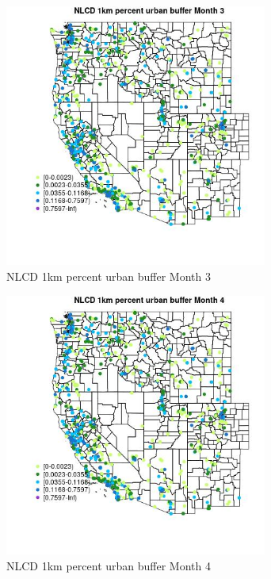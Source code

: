 \begin{figure} 
\centering  
\includegraphics[width=0.77\textwidth]{Code_Outputs/Report_ML_input_PM25_Step4_part_f_de_duplicated_aveswNAs_MapObsMo3NLCD_1km_percent_urban_buffer.jpg} 
\caption{\label{fig:Report_ML_input_PM25_Step4_part_f_de_duplicated_aveswNAsMapObsMo3NLCD_1km_percent_urban_buffer}NLCD 1km percent urban buffer Month 3} 
\end{figure} 
 

\clearpage 

\begin{figure} 
\centering  
\includegraphics[width=0.77\textwidth]{Code_Outputs/Report_ML_input_PM25_Step4_part_f_de_duplicated_aveswNAs_MapObsMo4NLCD_1km_percent_urban_buffer.jpg} 
\caption{\label{fig:Report_ML_input_PM25_Step4_part_f_de_duplicated_aveswNAsMapObsMo4NLCD_1km_percent_urban_buffer}NLCD 1km percent urban buffer Month 4} 
\end{figure} 
 

